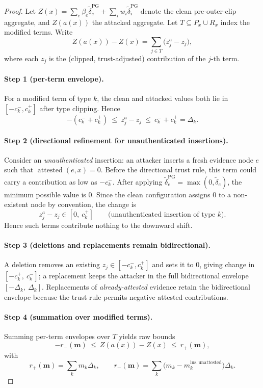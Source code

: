 \documentclass[11pt]{article}
\theoremstyle{plain}
\theoremstyle{definition}
\DeclareMathOperator{\attested}{attested}
\begin{document}
\begin{proof}
Let $Z(x) = \sum_e \beta_e \tilde\delta_e^{\mathrm{PG}} + \sum_i w_i \tilde\delta_i^{\mathrm{PG}}$ denote
the clean pre-outer-clip aggregate, and $Z(a(x))$ the attacked aggregate.
Let $T \subseteq P_x \cup R_x$ index the modified terms. Write
\[
Z(a(x)) - Z(x) = \sum_{j \in T} \bigl(z_j^{a} - z_j\bigr),
\]
where each $z_j$ is the (clipped, trust-adjusted) contribution of the $j$-th term.

\paragraph{Step 1 (per-term envelope).}
For a modified term of type $k$, the clean and attacked values both lie in $[-c_k^-, c_k^+]$
after type clipping. Hence
\[
-(c_k^- + c_k^+) \ \le\ z_j^{a} - z_j \ \le\ c_k^- + c_k^+ = \Delta_k.
\]

\paragraph{Step 2 (directional refinement for unauthenticated insertions).}
Consider an \emph{unauthenticated} insertion: an attacker inserts a fresh evidence node $e$ such that
$\attested(e, x) = 0$. Before the directional trust rule, this term could carry a contribution as low as $-c_k^-$.
After applying $\tilde\delta_e^{\mathrm{PG}} = \max(0, \tilde\delta_e)$, the minimum possible value is $0$.
Since the clean configuration assigns $0$ to a non-existent node by convention, the change is
\[
z_j^{a} - z_j \in [0,\ c_k^+] \qquad \text{(unauthenticated insertion of type }k\text{)}.
\]
Hence such terms contribute nothing to the downward shift.

\paragraph{Step 3 (deletions and replacements remain bidirectional).}
A deletion removes an existing $z_j \in [-c_k^-, c_k^+]$ and sets it to $0$, giving change in $[-c_k^+,\ c_k^-]$;
a replacement keeps the attacker in the full bidirectional envelope $[-\Delta_k,\ \Delta_k]$.
Replacements of \emph{already-attested} evidence retain the bidirectional envelope because the trust rule
permits negative attested contributions.

\paragraph{Step 4 (summation over modified terms).}
Summing per-term envelopes over $T$ yields raw bounds
\[
-r_-(\mathbf m) \ \le\ Z(a(x)) - Z(x) \ \le\ r_+(\mathbf m),
\]
with
\[
r_+(\mathbf m) = \sum_k m_k \Delta_k,
\qquad
r_-(\mathbf m) = \sum_k \big(m_k - m_k^{\mathrm{ins,unattested}}\big)\Delta_k.
\]


\end{proof}
\end{document}
